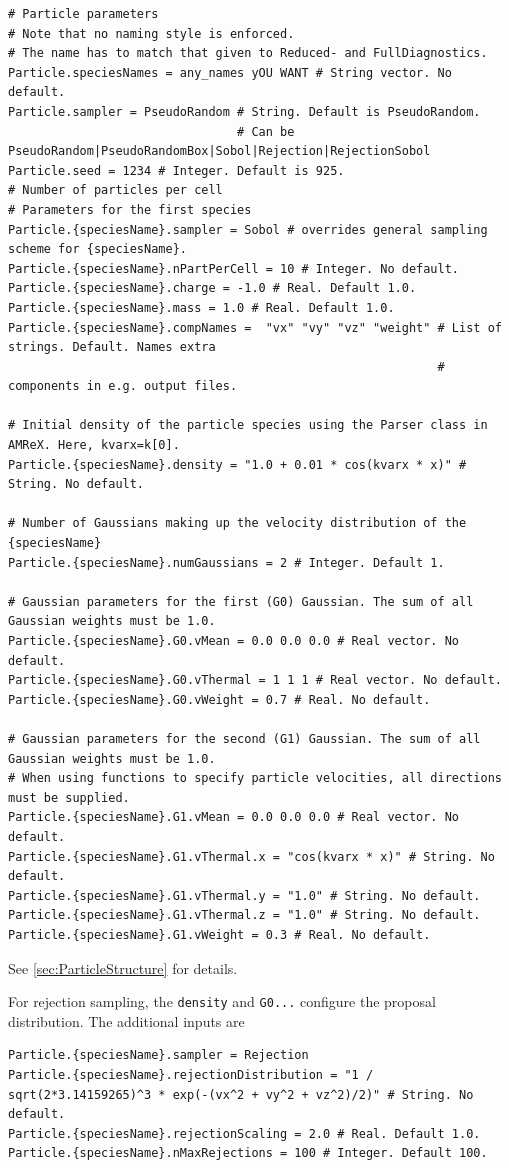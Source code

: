 \documentclass[11pt]{article}
\begin{document}
\begin{lstlisting}[language=pkgconfig]
# Particle parameters
# Note that no naming style is enforced.
# The name has to match that given to Reduced- and FullDiagnostics.
Particle.speciesNames = any_names yOU WANT # String vector. No default.
Particle.sampler = PseudoRandom # String. Default is PseudoRandom.
                                # Can be PseudoRandom|PseudoRandomBox|Sobol|Rejection|RejectionSobol
Particle.seed = 1234 # Integer. Default is 925.
# Number of particles per cell
# Parameters for the first species
Particle.{speciesName}.sampler = Sobol # overrides general sampling scheme for {speciesName}.
Particle.{speciesName}.nPartPerCell = 10 # Integer. No default.
Particle.{speciesName}.charge = -1.0 # Real. Default 1.0.
Particle.{speciesName}.mass = 1.0 # Real. Default 1.0.
Particle.{speciesName}.compNames =  "vx" "vy" "vz" "weight" # List of strings. Default. Names extra
                                                            # components in e.g. output files.

# Initial density of the particle species using the Parser class in AMReX. Here, kvarx=k[0].
Particle.{speciesName}.density = "1.0 + 0.01 * cos(kvarx * x)" # String. No default.

# Number of Gaussians making up the velocity distribution of the {speciesName}
Particle.{speciesName}.numGaussians = 2 # Integer. Default 1.

# Gaussian parameters for the first (G0) Gaussian. The sum of all Gaussian weights must be 1.0.
Particle.{speciesName}.G0.vMean = 0.0 0.0 0.0 # Real vector. No default.
Particle.{speciesName}.G0.vThermal = 1 1 1 # Real vector. No default.
Particle.{speciesName}.G0.vWeight = 0.7 # Real. No default.

# Gaussian parameters for the second (G1) Gaussian. The sum of all Gaussian weights must be 1.0.
# When using functions to specify particle velocities, all directions must be supplied.
Particle.{speciesName}.G1.vMean = 0.0 0.0 0.0 # Real vector. No default.
Particle.{speciesName}.G1.vThermal.x = "cos(kvarx * x)" # String. No default.
Particle.{speciesName}.G1.vThermal.y = "1.0" # String. No default.
Particle.{speciesName}.G1.vThermal.z = "1.0" # String. No default.
Particle.{speciesName}.G1.vWeight = 0.3 # Real. No default.
\end{lstlisting}
See \ref{sec:ParticleStructure} for details.

For rejection sampling, the \verb|density| and \verb|G0...| configure the proposal distribution. The additional inputs are
\begin{lstlisting}[language=pkgconfig]
Particle.{speciesName}.sampler = Rejection
Particle.{speciesName}.rejectionDistribution = "1 / sqrt(2*3.14159265)^3 * exp(-(vx^2 + vy^2 + vz^2)/2)" # String. No default.
Particle.{speciesName}.rejectionScaling = 2.0 # Real. Default 1.0.
Particle.{speciesName}.nMaxRejections = 100 # Integer. Default 100.
\end{lstlisting}
\end{document}
